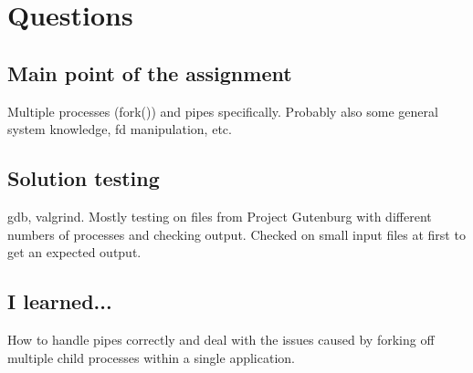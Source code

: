 \documentclass[letterpaper,10pt,titlepage]{article}
\begin{document}
\section{Questions}
\subsection{Main point of the assignment}
Multiple processes (fork()) and pipes specifically. Probably also some general
system knowledge, fd manipulation, etc.

\subsection{Solution testing}
gdb, valgrind. Mostly testing on files from Project Gutenburg with different numbers
of processes and checking output. Checked on small input files at first to get an
expected output.

\subsection{I learned...}
How to handle pipes correctly and deal with the issues caused by forking off multiple
child processes within a single application.
\end{document}
